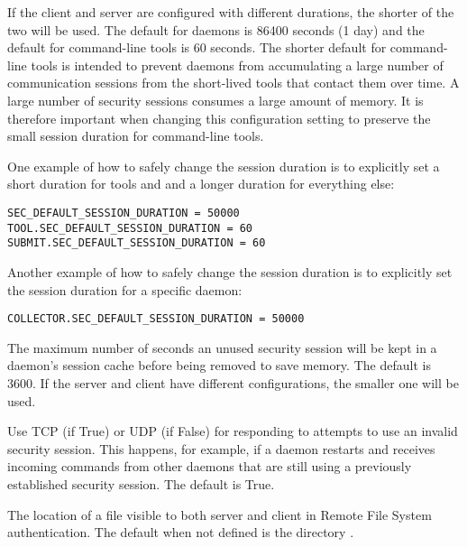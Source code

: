 \begin{description}
  If the client and server are configured with different durations,
  the shorter of the two will be used.  The default for daemons is
  86400 seconds (1 day) and the default for command-line tools is 60
  seconds.  The shorter default for command-line tools is intended to
  prevent daemons from accumulating a large number of communication
  sessions from the short-lived tools that contact them over time.  A
  large number of security sessions consumes a large amount of memory.
  It is therefore important when changing this configuration setting
  to preserve the small session duration for command-line tools.

  One example of how to safely change the session duration is to
  explicitly set a short duration for tools and 
  and a longer duration for everything else:

\begin{verbatim}
SEC_DEFAULT_SESSION_DURATION = 50000
TOOL.SEC_DEFAULT_SESSION_DURATION = 60
SUBMIT.SEC_DEFAULT_SESSION_DURATION = 60
\end{verbatim}

Another example of how to safely change the session duration is to
explicitly set the session duration for a specific daemon:

\begin{verbatim}
COLLECTOR.SEC_DEFAULT_SESSION_DURATION = 50000
\end{verbatim}

\label{param:SecDefaultSessionLease}
\item[\Macro{SEC\_<access-level>\_SESSION\_LEASE}]
  The maximum number of seconds an unused security session will be
  kept in a daemon's session cache before being removed to save memory.
  The default is 3600.  If the server and client have different
  configurations, the smaller one will be used.

\label{param:SecInvalidateSessionsViaTcp}
\item[\Macro{SEC\_INVALIDATE\_SESSIONS\_VIA\_TCP}]
  Use TCP (if True) or UDP (if False)
  for responding to attempts to use an invalid security session.  This happens,
  for example, if a daemon restarts and receives incoming commands from
  other daemons that are still using a previously established security session.
  The default is True.

\label{param:FSRemoteDir}
\item[\Macro{FS\_REMOTE\_DIR}]
  The location of a file visible to both server and client in
  Remote File System authentication.
  The default when not defined is the directory 
  .


\end{description}
